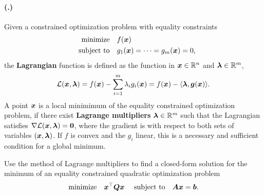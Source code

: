 \documentclass{article}
\newcounter{problemSheetNumber}
\newcounter{problems}
\renewcommand{\problem}{\paragraph{(\theproblemSheetNumber.\theproblems)}\addtocounter{problems}{1}}
\begin{document}
\problem Given a constrained optimization problem with equality constraints
\begin{align*}
  \text{minimize}\quad & f(\bm{x})\\
  \quad\text{subject to}\quad & g_1(\bm{x}) = \cdots = g_m(\bm{x}) = 0,
\end{align*}
the \textbf{Lagrangian} function is defined as the function in $\bm{x}\in \mathbb{R}^n$ and $\bm{\lambda}\in \mathbb{R}^m$,
\begin{equation*}
  \mathcal{L}(\bm{x},\bm{\lambda}) = f(\bm{x})-\sum_{i=1}^m \lambda_i g_i(\bm{x}) = f(\bm{x})-\langle {\bm{\lambda}}, {\bm{g}(\bm{x})} \rangle.
\end{equation*}
A point $\bm{x}$ is a local minimimum of the equality constrained optimization problem, if there exist \textbf{Lagrange multipliers} $\bm{\lambda}\in \mathbb{R}^m$ such that the Lagrangian satisfies $\nabla \mathcal{L}(\bm{x},\bm{\lambda})=\bm{0}$, where the gradient is with respect to both sets of variables $(\bm{x},\bm{\lambda})$. If $f$ is convex and the $g_i$ linear, this is a necessary and sufficient condition for a global minimum.

Use the method of Lagrange multipliers to find a closed-form solution for the minimum of an equality constrained quadratic optimization problem
\begin{equation*}
\text{minimize}\quad \bm{x}^{\top}\bm{Q}\bm{x} \ \quad\text{subject to}\quad \bm{A}\bm{x}=\bm{b}.
\end{equation*}
%
\end{document}
